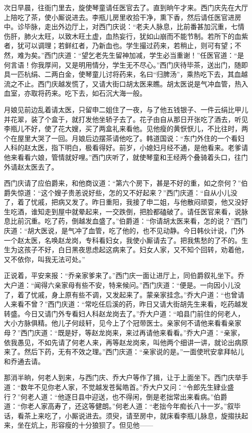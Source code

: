 次日早晨，往衙门里去，旋使琴童请任医官去了。直到晌午才来。西门庆先在大厅上陪吃了茶，使小厮说进去。李瓶儿房里收拾干净，熏下香，然后请任医官进房中。诊毕脉，走出外边厅上，对西门庆说：“老夫人脉息，比前番甚加沉重，七情伤肝，肺火太旺，以致木旺土虚，血热妄行，犹如山崩而不能节制。若所下的血紫者，犹可以调理；若鲜红者，乃新血也。学生撮过药来，若稍止，则可有望；不然，难为矣。”西门庆道：“望乞老先生留神加减，学生必当重谢！”任医官道：“是何言语！你我厚间，又是明用情分，学生无不尽心。”西门庆待毕茶，送出门，随即具一匹杭绢、二两白金，使琴童儿讨将药来，名曰“归脾汤”，乘热吃下去，其血越流之不止。西门庆越发慌了，又请大街口胡太医来瞧。胡太医说是气冲血管，热入血室，亦取将药来。吃下去，如石沉大海一般。

月娘见前边乱着请太医，只留申二姐住了一夜，与了他五钱银子、一件云绢比甲儿并花翠，装了个盒于，就打发他坐轿子去了。花子由自从那日开张吃了酒去，听见李瓶儿不好，使了花大嫂，买了两盒礼来看他。见他瘦的黄恹恹儿，不比往时，两个在屋里大哭了一回。月娘后边摆茶请他吃了。韩道国说：“东门外住的一个看妇人科的赵太医，指下明白，极看得好。前岁，小媳妇月经不通，是他看来。老爹请他来看看六娘，管情就好哩。”西门庆听了，就使琴童和王经两个叠骑着头口，往门外请赵太医去了。

西门庆请了应伯爵来，和他商议道：“第六个房下，甚是不好的重，如之奈何？”伯爵失惊道：“这个嫂子贵恙说好些，怎的又不好起来？”西门庆道：“自从小儿没了，着了忧戚，把病又发了。昨日重阳，我接了申二姐，与他散闷顽耍，他又没好生吃酒，谁知走到屋中就晕起来，一交跌倒，把脸都磕破了。请任医官来看，说脉息比前沉重。吃了药，倒越发血盛了。”伯爵道：“你请胡太医来看，怎的说？”西门庆道：“胡大医说，是气冲了血管，吃了他的，也不见动静。今日韩伙计说，门外一个赵太医，名唤赵龙岗，专科看妇女，我使小厮请去了。把我焦愁的了不的。生生为这孩子不好，白日黑夜思虑起这病来了。妇女人家，又不知个回转，劝着他，又不依你，叫我无法可处。”

正说着，平安来报：“乔亲家爹来了。”西门庆一面让进厅上，同伯爵叙礼坐下。乔大户道：“闻得六亲家母有些不安，特来候问。”西门庆道：“便是。一向因小儿没了，着了忧戚，身上原有些不调，又发起来了。蒙亲家挂念。”乔大户道：“也曾请人来看不曾？”西门庆道：“常吃任后溪的药，昨日又请大街胡先生来看，吃药越发转盛。今日又请门外专看妇人科赵龙岗去了。”乔大户道：“咱县门前住的何老人，大小方脉俱精。他儿子何歧轩，见今上了个冠带医士。亲家何不请他来看看亲家母？”西门庆道：“既是好，等赵龙岗来，来过再请他来看看。”乔大户道：“亲家，依我愚见，不如先请了何老人来，再等赵龙岗来，叫他两个细讲一讲，就论出病原来了。然后下药，无有不效之理。”西门庆道：“亲家说的是。”一面使玳安拿拜帖儿和乔通去请。

那消半晌，何老人到来，与西门庆、乔大户等作了揖，让于上面坐下。西门庆举手道：“数年不见你老人家，不觉越发苍髯皓首。”乔大户又问：“令郎先生肄业盛行？”何老人道：“他逐日县中迎送，也不得闲，倒是老拙常出来看病。”伯爵道：“你老人家高寿了，还这等健朗。”何老人道：“老拙今年痴长八十一岁。”叙毕话，看茶上来吃了，小厮说进去。须臾，请至房中，就床看李瓶儿脉息，旋搊扶起来，坐在炕上，形容瘦的十分狼狈了。但见他——

